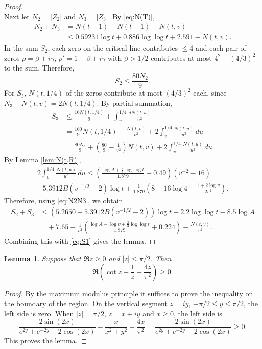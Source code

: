 \documentclass[10pt]{amsart}
\theoremstyle{remark}
\theoremstyle{plain}
\newtheorem{lemma}{Lemma}[section]
\numberwithin{equation}{section}
\theoremstyle{definition}
\def\({\left(}
\def\){\right)}
\newcommand{\be}{\begin{equation}}
\begin{document}
\begin{proof}
\begin{equation}
\end{equation}
Next let $N_2=|Z_2|$ and $N_3=|Z_3|$.
By \eqref{eq:N(T)},
\be
\begin{split}
N_2+N_3 &= N(t+1)-N(t-1)-N(t,v) \\
&\le 0.59231\log t + 0.886\log\log t+2.591-N(t,v).
\end{split}
\label{eq:N2N3}
\end{equation}
In the sum $S_2$, each zero on the critical line contributes $\le 4$
and each pair of zeros $\rho=\beta+i\gamma$, $\rho'=1-\beta+i\gamma$
with $\beta>1/2$ contributes at most $4^2+(4/3)^2$ to the sum.  Therefore,
$$
S_2 \le \frac{80 N_2}{9}.
$$
For $S_3$, $N(t,1/4)$ of the zeros contribute at most
 $(4/3)^2$ each, since $N_3+N(t,v)=2N(t,1/4)$.
By partial summation,
\begin{align*}
S_3 &\le \frac{16N(t,1/4)}{9} + \int_v^{1/4} \frac{dN(t,u)}{u^2} \\
&= \frac{160}{9}N(t,1/4) - \frac{N(t,v)}{v^2} +
2\int_{v}^{1/4} \frac{N(t,u)}{u^3}\, du \\
&= \frac{80N_3}{9} + \( \frac{80}{9} - \frac{1}{v^2} \) N(t,v) +
2\int_{v}^{1/4} \frac{N(t,u)}{u^3}\, du.
\end{align*}
By Lemma \ref{lem:N(t,R)},
\begin{multline*}
 2\int_{v}^{1/4} \frac{N(t,u)}{u^3}\, du \le
\( \frac{\log A+\tfrac23\log\log t}{1.879}+0.49 \) \( v^{-2} - 16 \) \\
 + 5.3912 B \( v^{-1/2}-2 \)\log t +
 \frac{1}{1.879} \( 8-16\log 4 - \frac{1+2\log v}{2v^2} \).
\end{multline*}
Therefore, using \eqref{eq:N2N3}, we obtain
\begin{align*}
S_2 + S_3 &\le (5.2650+5.3912 B (v^{-1/2}-2))\log t +2.2\log\log t-8.5\log A\\
&\quad + 7.65 + \frac{1}{v^2} \( \frac{\log A-\log v+\tfrac23\log\log t}
{1.879}+0.224\) - \frac{N(t,v)}{v^2}.
\end{align*}
Combining this with \eqref{eq:S1} gives the lemma.
\end{proof}

%
%

\begin{lemma}\label{lem:cot}
Suppose that $\Re z \ge 0$ and $|z| \le \pi/2$.   Then
$$
\Re \( \cot z - \frac{1}{z} + \frac{4z}{\pi^2} \) \ge 0.
$$
\end{lemma}

\begin{proof}  By the maximum modulus principle 
it suffices to prove the inequality on the boundary of the region.
On the vertical segment $z=iy$, $-\pi/2 \le y\le \pi/2$, the left side
is zero.  When $|z|=\pi/2$, $z=x+iy$ and $x\ge 0$, the left side is
$$
\frac{2\sin(2x)}{e^{2y}+e^{-2y}-2\cos(2x)} - \frac{x}{x^2+y^2} + \frac{4x}
{\pi^2} = \frac{2\sin(2x)}{e^{2y}+e^{-2y}-2\cos(2x)} \ge 0.
$$
This proves the lemma.
\end{proof}
\end{document}
